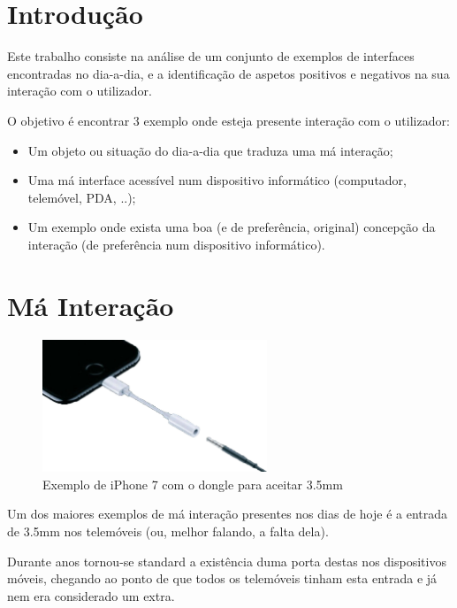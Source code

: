 \documentclass[11pt]{article}
\begin{document}
	
	
	\tableofcontents
	\pagebreak
	
	\large
	\section{Introdução}
	
	\normalsize
	Este trabalho consiste na análise de um conjunto de exemplos de interfaces encontradas no dia-a-dia, e a identificação de aspetos positivos e negativos na sua interação com o utilizador.
	
	O objetivo é encontrar 3 exemplo onde esteja presente interação com o utilizador:
	
	\begin{itemize}
		\item Um objeto ou situação do dia-a-dia que traduza uma má interação;
		\item Uma má interface acessível num dispositivo informático (computador,
		telemóvel, PDA, ..);
		\item Um exemplo onde exista uma boa (e de preferência, original) concepção
		da interação (de preferência num dispositivo informático).
	\end{itemize}
	
	\large
	\section{Má Interação}
	
	\normalsize
	\begin{figure}[h]
		\includegraphics[width=0.6\textwidth]{dongle-life}
		\centering
		\caption{Exemplo de iPhone 7 com o dongle para aceitar 3.5mm}
		\label{fig:dongle-life}
	\end{figure}
	
	Um dos maiores exemplos de má interação presentes nos dias de hoje é a entrada de 3.5mm nos telemóveis (ou, melhor falando, a falta dela).
	
	Durante anos tornou-se standard a existência duma porta destas nos dispositivos móveis, chegando ao ponto de que todos os telemóveis tinham esta entrada e já nem era considerado um extra.
	
\end{document}

